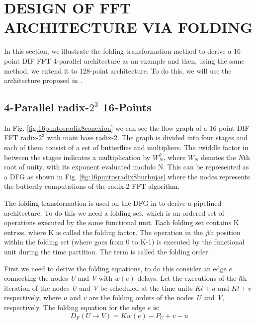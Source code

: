 \documentclass[journal,comsoc]{IEEEtran}
\begin{document}
\section{DESIGN OF FFT ARCHITECTURE VIA FOLDING}
In this section, we illustrate the folding transformation method to derive a 16-point DIF FFT 4-parallel architecture as an example and then, using the same method, we extend it to 128-point architecture. To do this, we will use the architecture proposed in \cite{ayinala_pipelined_2012}.
\subsection{4-Parallel radix-$2^3$ 16-Points}
In Fig. \ref{fig:16puntosradix8conexion} we can see the flow graph of a 16-point DIF FFT radix-$2^3$ with main base radix-2. The graph is divided into four stages and each of them consist of a set of butterflies and multipliers. The twiddle factor in between the stages indicates a multiplication by $W^k_N$, where $W_N$ denotes the \textit{N}th root of unity, with its exponent evaluated modulo N. This can be represented as a DFG as shown in Fig. \ref{fig:16puntosradix8burbujas} where the nodes represents the butterfly computations of the radix-2 FFT algorithm. 

The folding transformation is used on the DFG in to derive a pipelined architecture. To do this we need a folding set, which is an ordered set of operations executed by the same functional unit. Each folding set contains K entries, where K is called the folding factor. The operation in the \textit{j}th position within the folding set (where goes from 0 to K-1) is executed by the functional unit during the time partition. The term is called the folding order.

First we need to derive the folding equations, to do this consider an edge $e$ connecting the nodes \textit{U} and \textit{V} with $w(e)$ delays. Let the executions of the \textit{l}th iteration of the nodes \textit{U} and \textit{V} be scheduled at the time units $Kl+u$ and $Kl+v$ respectively, where $u$ and $v$ are the folding orders of the nodes \textit{U} and \textit{V}, respectively. The folding equation for the edge $e$ is:
\begin{equation}\label{eqn:fold_equation}
D_F(U \to V) = Kw(e)-P_U+v-u
\end{equation}
\end{document}
